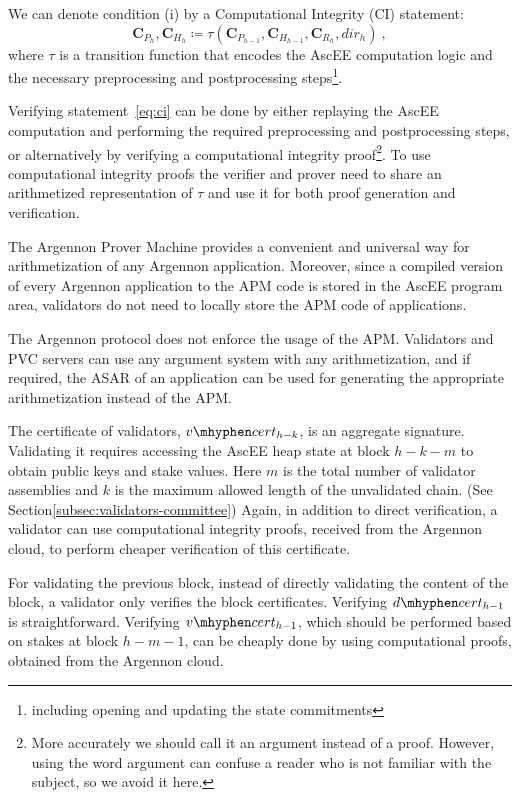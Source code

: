 We can denote condition (i) by a Computational Integrity (CI) statement:
\begin{equation}
    \label{eq:ci}
    \mathbf{C}_{P_h},\mathbf{C}_{H_h} \coloneqq \tau(\mathbf{C}_{P_{h-1}},\mathbf{C}_{H_{h-1}},\mathbf{C}_{R_{h}},
    dir_h)\ ,
\end{equation}
where $\tau$ is a transition function that encodes the AscEE computation logic and the necessary preprocessing and
postprocessing steps\footnote{including opening and updating the state commitments}.

Verifying statement~\ref{eq:ci} can be done by either replaying the AscEE computation and performing the required
preprocessing and postprocessing steps, or alternatively by
verifying a computational integrity proof\footnote{More accurately we should call it an argument instead of a proof.
However, using the word argument can confuse a reader who is not familiar with the subject, so we avoid it here.}.
To use computational integrity proofs the verifier and prover need to
share an arithmetized representation of $\tau$ and use it for both proof generation and verification.

The Argennon Prover Machine provides a convenient and universal way for arithmetization of any Argennon
application. Moreover, since a compiled version of every Argennon application to the APM code is stored in the AscEE
program area, validators do not need to locally store the APM code of applications.

The Argennon protocol does not enforce the usage of the APM. Validators and PVC servers can use any argument system
with any arithmetization, and if required, the ASAR of an application can be used
for generating the appropriate arithmetization instead of the APM\@.

The certificate of validators, $v \mhyphen cert_{h-k}$, is an aggregate signature. Validating it requires accessing the
AscEE heap state at block $h-k-m$ to obtain public keys and stake values. Here $m$ is the total number of validator
assemblies and $k$ is the maximum allowed length of
the unvalidated chain. (See Section\ref{subsec:validators-committee})
Again, in addition to direct verification, a validator can use computational integrity proofs, received from the
Argennon cloud, to perform cheaper verification of this certificate.

For validating the previous block, instead of directly validating the content of the block, a validator only
verifies the block certificates. Verifying $d \mhyphen cert_{h-1}$ is straightforward. Verifying $v \mhyphen
cert_{h-1}$, which should be performed based on stakes at block $h-m-1$, can be cheaply done by using computational
proofs, obtained from the Argennon cloud.

